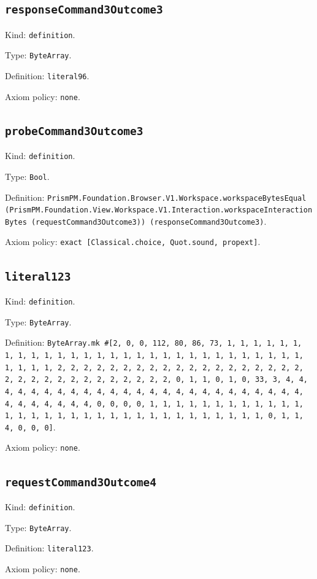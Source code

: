 \documentclass[11pt]{article}
\begin{document}
\subsection*{\texttt{responseCommand3Outcome3}}
\noindent Kind: \texttt{definition}.\par
\noindent Type: \texttt{ByteArray}.\par
\noindent Definition: \texttt{literal96}.\par
\noindent Axiom policy: \texttt{none}.\par
\subsection*{\texttt{probeCommand3Outcome3}}
\noindent Kind: \texttt{definition}.\par
\noindent Type: \texttt{Bool}.\par
\noindent Definition: \texttt{PrismPM.Foundation.Browser.V1.Workspace.workspaceBytesEqual (PrismPM.Foundation.View.Workspace.V1.Interaction.workspaceInteractionBytes (requestCommand3Outcome3)) (responseCommand3Outcome3)}.\par
\noindent Axiom policy: \texttt{exact [Classical.choice, Quot.sound, propext]}.\par
\subsection*{\texttt{literal123}}
\noindent Kind: \texttt{definition}.\par
\noindent Type: \texttt{ByteArray}.\par
\noindent Definition: \texttt{ByteArray.mk \#[2, 0, 0, 112, 80, 86, 73, 1, 1, 1, 1, 1, 1, 1, 1, 1, 1, 1, 1, 1, 1, 1, 1, 1, 1, 1, 1, 1, 1, 1, 1, 1, 1, 1, 1, 1, 1, 1, 1, 1, 2, 2, 2, 2, 2, 2, 2, 2, 2, 2, 2, 2, 2, 2, 2, 2, 2, 2, 2, 2, 2, 2, 2, 2, 2, 2, 2, 2, 2, 2, 2, 2, 0, 1, 1, 0, 1, 0, 33, 3, 4, 4, 4, 4, 4, 4, 4, 4, 4, 4, 4, 4, 4, 4, 4, 4, 4, 4, 4, 4, 4, 4, 4, 4, 4, 4, 4, 4, 4, 4, 4, 4, 0, 0, 0, 0, 1, 1, 1, 1, 1, 1, 1, 1, 1, 1, 1, 1, 1, 1, 1, 1, 1, 1, 1, 1, 1, 1, 1, 1, 1, 1, 1, 1, 1, 1, 1, 1, 0, 1, 1, 4, 0, 0, 0]}.\par
\noindent Axiom policy: \texttt{none}.\par
\subsection*{\texttt{requestCommand3Outcome4}}
\noindent Kind: \texttt{definition}.\par
\noindent Type: \texttt{ByteArray}.\par
\noindent Definition: \texttt{literal123}.\par
\noindent Axiom policy: \texttt{none}.\par
\end{document}
